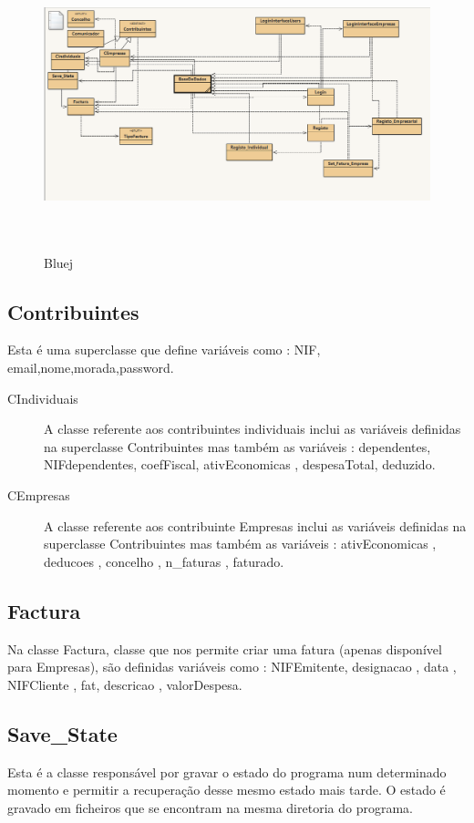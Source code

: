 \documentclass[a4paper]{article}
\begin{document}
\begin{figure}[htbp]
	\centering
	\includegraphics[width = 420pt,height = 240pt]{bluej.png}
	\caption{Bluej}
\end{figure}

\subsection{Contribuintes}
Esta é uma superclasse que define variáveis como : NIF, email,nome,morada,password.

\begin{description}
	\item[CIndividuais] A classe referente aos contribuintes individuais inclui as variáveis definidas na superclasse Contribuintes mas também as variáveis : dependentes, NIFdependentes, coefFiscal, ativEconomicas , despesaTotal, deduzido.

	\item[CEmpresas] A classe referente aos contribuinte Empresas 
	inclui as variáveis definidas na superclasse Contribuintes mas também as variáveis : ativEconomicas , deducoes , concelho , n_faturas , faturado.
\end{description}

\subsection{Factura}
Na classe Factura, classe que nos permite criar uma fatura (apenas disponível para Empresas), são definidas variáveis como : NIFEmitente, designacao , data , NIFCliente , fat, descricao , valorDespesa.

\subsection{Save_State}
Esta é a classe responsável por gravar o estado do programa num determinado momento e permitir a recuperação desse mesmo estado mais tarde. O estado é gravado em ficheiros que se encontram na mesma diretoria do programa.
\end{document}
